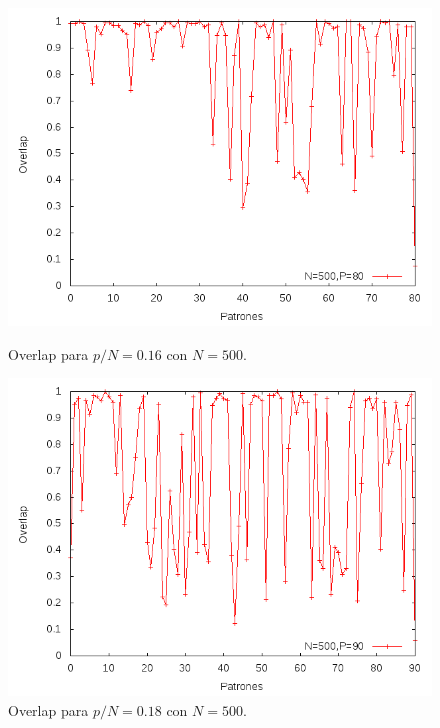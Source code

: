 \documentclass[aps,prb,onecolumn,10pt,floatfix,superscriptaddress]{article} %
\begin{document}
\begin{figure}[!htd] 
	\begin{minipage}[b]{0.450\linewidth}
   	    \includegraphics[scale=0.32 ]{16.png}
   	    \begin{center}
  \caption{\label{16} Overlap para $p/N = 0.16$ con $N=500$.}
     	    \end{center}
   \end{minipage}
   \begin{minipage}[b]{0.450\linewidth}
   	    \includegraphics[scale=0.32 ]{18.png}
   	     \begin{center}
  \caption{\label{18}Overlap para $p/N = 0.18$ con $N=500$.}
     	    \end{center}
   \end{minipage} 
 \end{figure}
\end{document}
